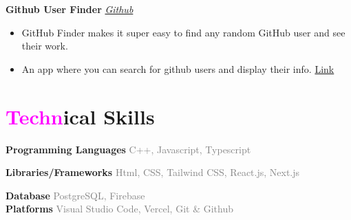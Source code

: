 \documentclass[letterpaper,11pt]{article}
\newcommand{\resumeItem}[1]{
  \item\small{
    {#1 \vspace{-1pt}}
  }
}
\newcommand{\resumeItemListStart}{\begin{itemize}[leftmargin=0.1in]}
\newcommand{\resumeItemListEnd}{\end{itemize}\vspace{-5pt}}
\begin{document}
\textbf{Github User Finder} \hspace{419pt} \href{https://github.com/ImSakshiRai/Github_User_Finder}{\color{gray!60}\textit{Github}} \vspace{-4pt}
\resumeItemListStart
    \resumeItem{\textcolor{gray!100}{\normalsize{GitHub Finder makes it super easy to find any random GitHub user and see their work.}}} \vspace{-8pt}
    \resumeItem{\textcolor{gray!100}{\normalsize{An app where you can search for github users and display their info.}}} \hspace{181pt}
    \textcolor{gray}{\normalsize{\href{https://imsakshirai.github.io/Github_User_Finder/}{Link}}} 
\vspace{-4pt}
\resumeItemListEnd


\section{\textcolor{magenta}{\fontsize{18}{15}\selectfont \textbf{Techn}}\fontsize{18}{15}\selectfont ical \fontsize{18}{15}\selectfont Skills \hrulefill }
 \begin{itemize}[leftmargin=0in, label={}]
    \small{\item{
     \textbf{\normalsize{Programming Languages}}{\hspace{0.8em} \normalsize{\textcolor{gray}{C++, Javascript, Typescript}}} \\
      \vspace{1.2pt}
      
     \textbf{\normalsize{Libraries/Frameworks}}{\hspace{2em} \normalsize{\textcolor{gray}{Html,  CSS, Tailwind CSS, React.js, Next.js}}} \\
      \vspace{1.2pt}
      
     \textbf{\normalsize{Database}}{\hspace{8.6em} \normalsize{\textcolor{gray}{PostgreSQL, Firebase }}} \\
     \textbf{\normalsize{Platforms}}{\hspace{8.4em} \normalsize{\textcolor{gray}{Visual Studio Code, Vercel, Git \& Github  }}}

     }}
 \end{itemize}
 \vspace{-16pt}
 
\end{document}
